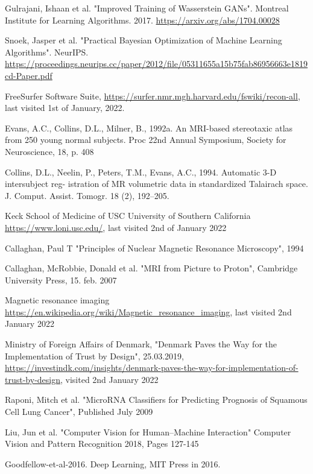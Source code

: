 \documentclass[12pt, fleqn, titlepage]{article}
\newcommand{\1}[1]{\mathds{1}\left[#1\right]}
\begin{document}
\begin{thebibliography}{9}
		 Gulrajani, Ishaan et al. "Improved Training of Wasserstein GANs". Montreal Institute for Learning Algorithms. 2017. \url{https://arxiv.org/abs/1704.00028}
		
		 Snoek, Jasper et al. "Practical Bayesian Optimization of Machine Learning Algorithms". NeurIPS. \url{https://proceedings.neurips.cc/paper/2012/file/05311655a15b75fab86956663e1819cd-Paper.pdf}

		 FreeSurfer Software Suite, \url{https://surfer.nmr.mgh.harvard.edu/fswiki/recon-all}, last visited 1st of January, 2022.
		
		 Evans, A.C., Collins, D.L., Milner, B., 1992a. An MRI-based stereotaxic atlas from 250 young normal subjects. Proc 22nd Annual Symposium, Society for Neuroscience, 18, p. 408
		
		 Collins, D.L., Neelin, P., Peters, T.M., Evans, A.C., 1994. Automatic 3-D intersubject reg- istration of MR volumetric data in standardized Talairach space. J. Comput. Assist. Tomogr. 18 (2), 192–205.
		
		 Keck School of Medicine of USC University of Southern California \url{https://www.loni.usc.edu/}, last visited 2nd of January 2022
		
		 Callaghan, Paul T "Principles of Nuclear
		Magnetic Resonance Microscopy", 1994
		
		 Callaghan, McRobbie, Donald et al. "MRI from Picture to Proton", Cambridge University Press, 15. feb. 2007
		
		 Magnetic resonance imaging \url{https://en.wikipedia.org/wiki/Magnetic_resonance_imaging}, last visited 2nd January 2022
		
		 Ministry of Foreign Affairs of Denmark, "Denmark Paves the Way for the Implementation of Trust by Design", 25.03.2019, \url{https://investindk.com/insights/denmark-paves-the-way-for-implementation-of-trust-by-design}, visited 2nd January 2022
		
		 Raponi, Mitch et al. "MicroRNA Classifiers for Predicting Prognosis of Squamous Cell Lung Cancer", Published July 2009
		
		 Liu, Jun et al. "Computer Vision for Human–Machine Interaction" Computer Vision and Pattern Recognition 2018, Pages 127-145
		
		 Goodfellow-et-al-2016. Deep Learning, MIT Press in 2016.
		

\end{thebibliography}
\end{document}
